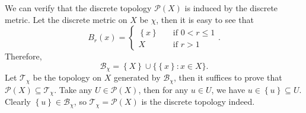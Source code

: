 \documentclass[math]{amznotes}
\theoremstyle{remark}
\begin{document}
We can verify that the discrete topology $\mathcal{P}\left(X\right)$ is induced by the discrete metric. Let the discrete metric on $X$ be $\chi$, then it is easy to see that 
\begin{equation*}
    B_r\left(x\right) = \begin{cases}
        \left\{x\right\} & \quad\textrm{if } 0 < r \leq 1 \\
        X & \quad\textrm{if } r > 1
    \end{cases}.
\end{equation*}
Therefore, 
\begin{equation*}
    \mathcal{B}_{\chi} = \left\{X\right\} \cup \bigl\{\left\{x\right\} \colon x \in X\bigr\}.
\end{equation*}
Let $\mathcal{T}_{\chi}$ be the topology on $X$ generated by $\mathcal{B}_{\chi}$, then it suffices to prove that $\mathcal{P}\left(X\right) \subseteq \mathcal{T}_{\chi}$. Take any $U \in \mathcal{P}\left(X\right)$, then for any $u \in U$, we have $u \in \left\{u\right\} \subseteq U$. Clearly $\left\{u\right\} \in \mathcal{B}_{\chi}$, so $\mathcal{T}_{\chi} = \mathcal{P}\left(X\right)$ is the discrete topology indeed.
\end{document}

